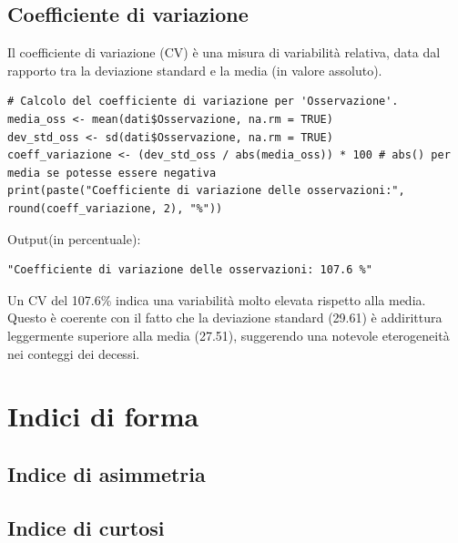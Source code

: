 \documentclass[14pt, openany, titlepage]{report} %
\begin{document}
\section{Coefficiente di variazione}
Il coefficiente di variazione (CV) è una misura di variabilità relativa,
 data dal rapporto tra la deviazione standard e la media (in valore assoluto).
\begin{center}
\begin{lstlisting}[breaklines=true]
# Calcolo del coefficiente di variazione per 'Osservazione'.
media_oss <- mean(dati$Osservazione, na.rm = TRUE)
dev_std_oss <- sd(dati$Osservazione, na.rm = TRUE)
coeff_variazione <- (dev_std_oss / abs(media_oss)) * 100 # abs() per media se potesse essere negativa
print(paste("Coefficiente di variazione delle osservazioni:", round(coeff_variazione, 2), "%"))
\end{lstlisting}
\end{center}
\noindent
Output(in percentuale):
\begin{verbatim}
"Coefficiente di variazione delle osservazioni: 107.6 %"
\end{verbatim}
Un CV del 107.6\% indica una variabilità molto elevata rispetto alla 
media. Questo è coerente con il fatto che la deviazione standard (29.61)
 è addirittura leggermente superiore alla media (27.51), suggerendo una
  notevole eterogeneità nei conteggi dei decessi.
\FloatBarrier


\chapter{Indici di forma}
 
\section{Indice di asimmetria}

\section{Indice di curtosi} 
\end{document}
